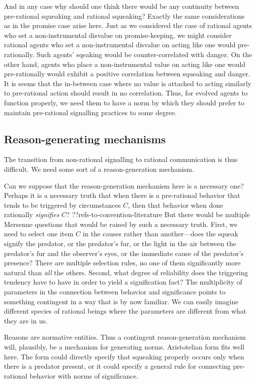And in any case why should one think there would be any continuity between pre-rational squeaking and rational squeaking?
Exactly the same considerations as in the promise case arise here. Just as we considered the case of rational
agents who set a non-instrumental disvalue on promise-keeping, we might consider rational agents who set a
non-instrumental disvalue on acting like one would pre-rationally. Such agents' sqeaking would be counter-correlated
with danger. On the other hand, agents who place a non-instrumental value on acting like one would pre-rationally would
exhibit a positive correlation between squeaking and danger. It is seems that the in-between case where
no value is attached to acting similarly to pre-rational action should result in no correlation. Thus, for evolved
agents to function properly, we need them to have a norm by which they should prefer to maintain pre-rational 
signalling practices to some degree. 

\subsection{Reason-generating mechanisms}
The transition from non-rational signalling to rational communication is thus difficult. We need some sort of 
a reason-generation mechanism.

Can we suppose that the reason-generation mechanism here is a necessary one? Perhaps it is a necessary truth that when
there is a pre-rational behavior that tends to be triggered by circumstances $C$, then that behavior when done rationally
\textit{signifies} $C$? ??refs-to-convention-literature 
But there would be multiple Mersenne questions that would be raised by such a necessary truth. First,
we need to select one item $C$ in the causes rather than another---does the squeak signify the predator, or the predator's fur, or the
light in the air between the predator's fur and the observer's eyes, or the immediate cause of the predator's presence? 
There are multiple selection rules, 
no one of them significantly more natural than \textit{all} the others. Second, what degree of reliability does the 
triggering tendency have to have in order to yield a signification fact? 
The multiplicity of parameters in the connection between behavior and
significance points to something contingent in a way that is by now familiar. 
We can easily imagine different species of rational beings where the parameters are
different from what they are in us. 

Reasons are normative entities. Thus a contingent reason-generation mechanism will, plausibly, be a mechanism for generating
norms. Aristotelian form fits well here. The form could directly specify that squeaking properly occurs only when there is a 
predator present, or it could specify a general rule for connecting pre-rational behavior with norms of significance. 

